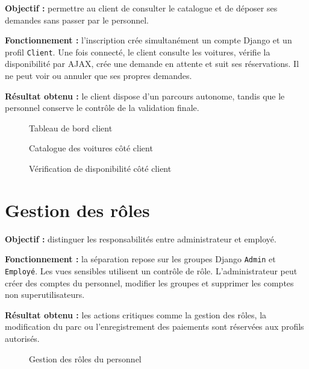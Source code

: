 \textbf{Objectif :} permettre au client de consulter le catalogue et de déposer ses demandes sans passer par le personnel.

\textbf{Fonctionnement :} l'inscription crée simultanément un compte Django et un profil \texttt{Client}. Une fois connecté, le client consulte les voitures, vérifie la disponibilité par AJAX, crée une demande en attente et suit ses réservations. Il ne peut voir ou annuler que ses propres demandes.

\textbf{Résultat obtenu :} le client dispose d'un parcours autonome, tandis que le personnel conserve le contrôle de la validation finale.

\begin{figure}[H]
\centering
{}
\caption{Tableau de bord client}
\end{figure}

\begin{figure}[H]
\centering
{}
\caption{Catalogue des voitures côté client}
\end{figure}

\begin{figure}[H]
\centering
{}
\caption{Vérification de disponibilité côté client}
\end{figure}

\section{Gestion des rôles}

\textbf{Objectif :} distinguer les responsabilités entre administrateur et employé.

\textbf{Fonctionnement :} la séparation repose sur les groupes Django \texttt{Admin} et \texttt{Employé}. Les vues sensibles utilisent un contrôle de rôle. L'administrateur peut créer des comptes du personnel, modifier les groupes et supprimer les comptes non superutilisateurs.

\textbf{Résultat obtenu :} les actions critiques comme la gestion des rôles, la modification du parc ou l'enregistrement des paiements sont réservées aux profils autorisés.

\begin{figure}[H]
\centering
{}
\caption{Gestion des rôles du personnel}
\end{figure}

